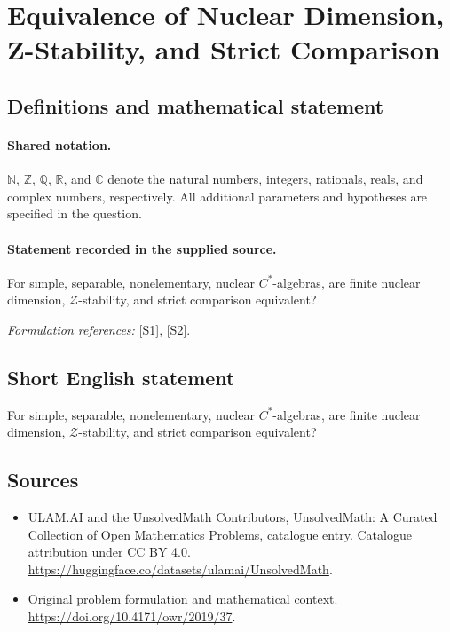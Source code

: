 \documentclass[11pt]{article}
\newcommand{\sref}[2]{\hyperlink{source:#1:#2}{[S#2]}}
\begin{document}
\section{Equivalence of Nuclear Dimension, Z-Stability, and Strict Comparison}\label{statement}

\subsection{Definitions and mathematical statement}

\paragraph{Shared notation.}$\mathbb N$, $\mathbb Z$, $\mathbb Q$, $\mathbb R$, and $\mathbb C$ denote the natural numbers, integers, rationals, reals, and complex numbers, respectively. All additional parameters and hypotheses are specified in the question.


\paragraph{Statement recorded in the supplied source.}
For simple, separable, nonelementary, nuclear $C^*$-algebras, are finite nuclear dimension, $\mathcal Z$-stability, and strict comparison equivalent?
\par\smallskip\textit{Formulation references:} \sref{statement}{1}, \sref{statement}{2}.
\subsection{Short English statement}
For simple, separable, nonelementary, nuclear $C^*$-algebras, are finite nuclear dimension, $\mathcal Z$-stability, and strict comparison equivalent?
\subsection{Sources}
\begin{itemize}
\item[\hypertarget{source:statement:1}{S1}] ULAM.AI and the UnsolvedMath Contributors, UnsolvedMath: A Curated Collection of Open Mathematics Problems, catalogue entry. Catalogue attribution under CC BY 4.0.
\url{https://huggingface.co/datasets/ulamai/UnsolvedMath}.
\item[\hypertarget{source:statement:2}{S2}] Original problem formulation and mathematical context.
\url{https://doi.org/10.4171/owr/2019/37}.
\end{itemize}
\label{end:statement}
\end{document}
